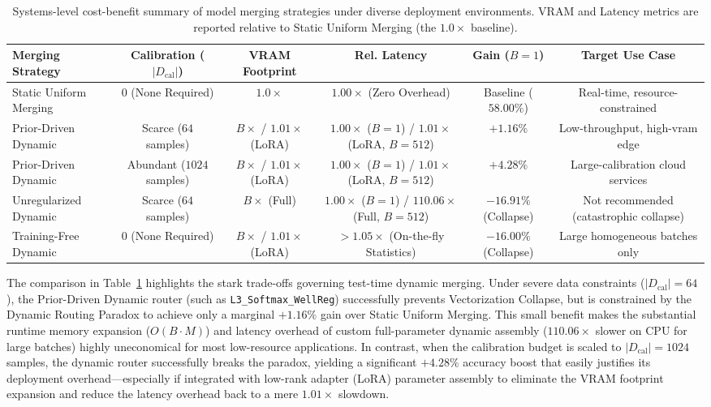\begin{table}[t]
\caption{Systems-level cost-benefit summary of model merging strategies under diverse deployment environments. VRAM and Latency metrics are reported relative to Static Uniform Merging (the $1.0\times$ baseline).}
\label{tab:cost_benefit_summary}
\vskip 0.15in
\begin{center}
\begin{small}
\begin{sc}
\setlength{\tabcolsep}{4pt}
\begin{tabular}{lccccc}
\toprule
\textbf{Merging Strategy} & \textbf{Calibration ($|D_{\text{cal}}|$)} & \textbf{VRAM Footprint} & \textbf{Rel. Latency} & \textbf{Gain ($B=1$)} & \textbf{Target Use Case} \\
\midrule
Static Uniform Merging    & 0 (None Required) & $1.0\times$ & $1.00\times$ (Zero Overhead) & Baseline ($58.00\%$) & Real-time, resource-constrained \\
Prior-Driven Dynamic      & Scarce ($64$ samples) & $B \times$ / $1.01\times$ (LoRA) & $1.00\times$ ($B=1$) / $1.01\times$ (LoRA, $B=512$) & $+1.16\%$ & Low-throughput, high-vram edge \\
Prior-Driven Dynamic      & Abundant ($1024$ samples) & $B \times$ / $1.01\times$ (LoRA) & $1.00\times$ ($B=1$) / $1.01\times$ (LoRA, $B=512$) & $+4.28\%$ & Large-calibration cloud services \\
Unregularized Dynamic     & Scarce ($64$ samples) & $B \times$ (Full) & $1.00\times$ ($B=1$) / $110.06\times$ (Full, $B=512$) & $-16.91\%$ (Collapse) & Not recommended (catastrophic collapse) \\
Training-Free Dynamic     & 0 (None Required) & $B \times$ / $1.01\times$ (LoRA) & $>1.05\times$ (On-the-fly Statistics) & $-16.00\%$ (Collapse) & Large homogeneous batches only \\
\bottomrule
\end{tabular}
\end{sc}
\end{small}
\end{center}
\vskip -0.1in
\end{table}

The comparison in Table~\ref{tab:cost_benefit_summary} highlights the stark trade-offs governing test-time dynamic merging. Under severe data constraints ($|D_{\text{cal}}| = 64$), the Prior-Driven Dynamic router (such as \texttt{L3\_Softmax\_WellReg}) successfully prevents Vectorization Collapse, but is constrained by the Dynamic Routing Paradox to achieve only a marginal $+1.16\%$ gain over Static Uniform Merging. This small benefit makes the substantial runtime memory expansion ($O(B \cdot M)$) and latency overhead of custom full-parameter dynamic assembly ($110.06\times$ slower on CPU for large batches) highly uneconomical for most low-resource applications. In contrast, when the calibration budget is scaled to $|D_{\text{cal}}| = 1024$ samples, the dynamic router successfully breaks the paradox, yielding a significant $+4.28\%$ accuracy boost that easily justifies its deployment overhead—especially if integrated with low-rank adapter (LoRA) parameter assembly to eliminate the VRAM footprint expansion and reduce the latency overhead back to a mere $1.01\times$ slowdown. 

